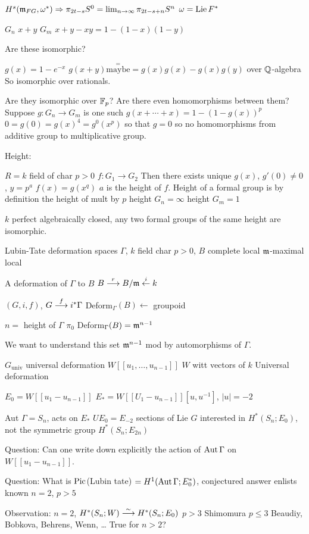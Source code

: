 $H^s(\mathfrak{m}_{FG}, \omega^*) \Rightarrow \pi_{2t-s}S^0= \lim_{n \to \infty} \pi_{2t-s+n} S^n$
$\omega= \operatorname{Lie} F^*$



\begin{ex}
$G_n$ $x+y$
$G_m$ $x+y-xy= 1-(1-x)(1-y)$

Are these isomorphic?

$g(x)= 1 - e^{-x}$
$g(x+y) \stackrel{=}{\text{maybe}}= g(x)g(x) - g(x)g(y)$
over $\mathbb{Q}$-algebra
So isomorphic over rationals.

Are they isomorphic over $\mathbb{F}_p$? Are there even homomorphisms between them?
Suppose $g: G_n \to G_m$ is one such
$g(x+\cdots+x)= 1-(1- g(x))^p$
$0= g(0)= g(x)^4= g^0(x^p)$ so that $g=0$ so no homomorphisms from additive group to multiplicative group. 
\end{ex}


Height: 

$R=k$ field of char $p>0$
$f: G_1 \to G_2$
Then there exists unique $g(x)$, $g'(0) \neq 0$, $y= p^a$
$f(x)= g(x^q)$
$a$ is the height of $f$.
Height of a formal group is by definition the height of mult by $p$
height $G_n= \infty$
height $G_m= 1$

\begin{thm}[Dieudonne]
$k$ perfect algebraically closed, any two formal groups of the same height are isomorphic. 
\end{thm}


Lubin-Tate deformation spaces
$\Gamma$, $k$ field char $p>0$, $B$ complete local $\mathfrak{m}$-maximal local

A deformation of $\Gamma$ to $B$ 
$B \stackrel{r}{\longrightarrow} B/\mathfrak{m} \stackrel{i}{\leftarrow} k$

$(G,i,f)$, $G \stackrel{f}{\longrightarrow} i^*\Gamma$
Deform$_\Gamma(B) \leftarrow$ groupoid

\begin{thm}[L-T]
$n=$ height of $\Gamma$
$\pi_0$ Deform$_\Gamma(B)= \mathfrak{m}^{n-1}$
\end{thm}

We want to understand this set $\mathfrak{m}^{n-1}$ mod by automorphisms of $\Gamma$.


$G_\text{univ}$ universal deformation 
$W[[u_1,\ldots,u_{n-1}]]$
$W$ witt vectors of $k$
Universal deformation


$E_0= W[[u_1-u_{n-1}]]$
$E_*= W[[U_1-u_{n-1}]][u,u^{-1}]$, $|u|= -2$

Aut $\Gamma= S_n$, acts on $E_*$
$UE_0= E_{-2}$ sections of Lie $G$
interested in $H^*(S_n; E_0)$, not the symmetric group
$H^*(S_n; E_{2n})$


Question: Can one write down explicitly the action of $\operatorname{Aut} \Gamma$ on $W[[u_1-u_{n-1}]]$.

Question: What is $\operatorname{Pic}$(Lubin tate) $=H^1(\operatorname{Aut} \Gamma; E_0^*)$, conjectured answer enlists known $n=2$, $p>5$


Observation: $n=2$, $H^*(S_n; W) \stackrel{\sim}{\longrightarrow} H^*(S_n;E_0)$
$p>3$ Shimomura
$p \leq 3$ Beaudiy, Bobkova, Behrens, Wenn, \dots
True for $n>2$?















